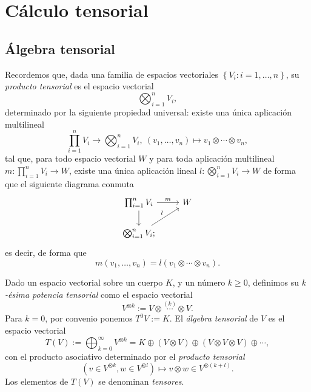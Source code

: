 \documentclass[11pt,a4paper]{amsbook}
\theoremstyle{remark} \newtheorem{rmk}[subsection]{Observación}
\theoremstyle{definition} \newtheorem{defn}[subsection]{Definición}
\theoremstyle{definition} \newtheorem{ex}[subsection]{Ejemplo}
\theoremstyle{definition} \newtheorem{ej}[subsection]{Ejercicio}
\begin{document}
\section{Cálculo tensorial}

\subsection{Álgebra tensorial} Recordemos que, dada una familia de espacios vectoriales $\left\{ V_i: i = 1,\dots, n \right\}$, su \emph{producto tensorial} es el espacio vectorial
\begin{equation*}
\bigotimes_{i=1}^n V_i,
\end{equation*}
determinado por la siguiente propiedad universal: existe una única aplicación multilineal
\begin{equation*}
 \prod_{i=1}^n V_i  \rightarrow \bigotimes_{i=1}^n V_i ,\ (v_1,\dots,v_n) \mapsto v_1\otimes \cdots \otimes v_n,
\end{equation*}
tal que, para todo espacio vectorial $W$ y para toda aplicación multilineal $m:\prod_{i=1}^n V_i \rightarrow W$, existe una única aplicación lineal $l:\bigotimes_{i=1}^n V_i \rightarrow W$ de forma que el siguiente diagrama conmuta
\begin{equation*}
\begin{tikzcd}
  \prod_{i=1}^n V_i \rar{m} \dar & W \\
  \bigotimes_{i=1}^n V_i; \ar{ru}{l}
\end{tikzcd}
\end{equation*}
es decir, de forma que
\begin{equation*}
m(v_1,\dots,v_n) = l(v_1\otimes \cdots \otimes v_n).
\end{equation*}

Dado un espacio vectorial sobre un cuerpo $K$, y un número $k\geq 0$, definimos su \emph{$k$-ésima potencia tensorial} como el espacio vectorial
\begin{equation*}
V^{\otimes k} := V\otimes \overset{(k)}{\cdots} \otimes V.
\end{equation*}
Para $k=0$, por convenio ponemos $T^0V:= K$. El \emph{álgebra tensorial} de $V$ es el espacio vectorial
\begin{equation*}
T(V) := \bigoplus_{k=0}^\infty V^{\otimes k} = K \oplus (V\otimes V) \oplus (V\otimes V \otimes V) \oplus \cdots,
\end{equation*}
con el producto asociativo determinado por el \emph{producto tensorial}
\begin{equation*}
(v \in V^{\otimes k} , w \in V^{\otimes l} ) \mapsto v \otimes w \in V^{\otimes (k+l)}.
\end{equation*}
Los elementos de $T(V)$ se denominan \emph{tensores}.
\end{document}

